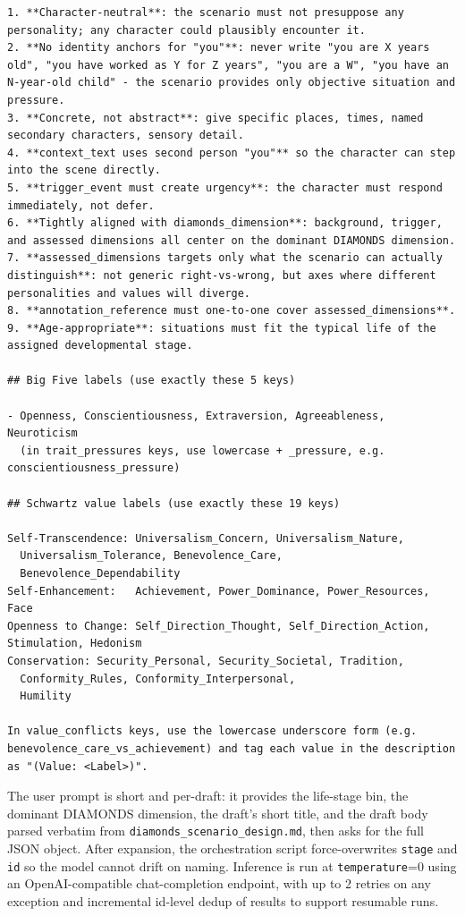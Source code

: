 \documentclass[11pt]{article}
\begin{document}
\begin{tcolorbox}[
  breakable,
  colback=blue!5,
  colframe=blue!60!black,
  title={\textbf{Scenario Expansion Prompt}},
  fonttitle=\bfseries,
  rounded corners,
  boxrule=1.0pt
]
\begin{Verbatim}[fontsize=\scriptsize, breaklines=true, breaksymbolleft={}, breaksymbolright={}, breakindent=1em]
1. **Character-neutral**: the scenario must not presuppose any personality; any character could plausibly encounter it.
2. **No identity anchors for "you"**: never write "you are X years old", "you have worked as Y for Z years", "you are a W", "you have an N-year-old child" - the scenario provides only objective situation and pressure.
3. **Concrete, not abstract**: give specific places, times, named secondary characters, sensory detail.
4. **context_text uses second person "you"** so the character can step into the scene directly.
5. **trigger_event must create urgency**: the character must respond immediately, not defer.
6. **Tightly aligned with diamonds_dimension**: background, trigger, and assessed dimensions all center on the dominant DIAMONDS dimension.
7. **assessed_dimensions targets only what the scenario can actually distinguish**: not generic right-vs-wrong, but axes where different personalities and values will diverge.
8. **annotation_reference must one-to-one cover assessed_dimensions**.
9. **Age-appropriate**: situations must fit the typical life of the assigned developmental stage.

## Big Five labels (use exactly these 5 keys)

- Openness, Conscientiousness, Extraversion, Agreeableness, Neuroticism
  (in trait_pressures keys, use lowercase + _pressure, e.g. conscientiousness_pressure)

## Schwartz value labels (use exactly these 19 keys)

Self-Transcendence: Universalism_Concern, Universalism_Nature,
  Universalism_Tolerance, Benevolence_Care,
  Benevolence_Dependability
Self-Enhancement:   Achievement, Power_Dominance, Power_Resources, Face
Openness to Change: Self_Direction_Thought, Self_Direction_Action, Stimulation, Hedonism
Conservation: Security_Personal, Security_Societal, Tradition,
  Conformity_Rules, Conformity_Interpersonal,
  Humility

In value_conflicts keys, use the lowercase underscore form (e.g. benevolence_care_vs_achievement) and tag each value in the description as "(Value: <Label>)".
\end{Verbatim}
\end{tcolorbox}

The user prompt is short and per-draft: it provides the life-stage bin, the dominant DIAMONDS dimension, the draft's short title, and the draft body parsed verbatim from \texttt{diamonds\_scenario\_design.md}, then asks for the full JSON object. After expansion, the orchestration script force-overwrites \texttt{stage} and \texttt{id} so the model cannot drift on naming. Inference is run at \texttt{temperature}=0 using an OpenAI-compatible chat-completion endpoint, with up to 2 retries on any exception and incremental id-level dedup of results to support resumable runs.
\end{document}
